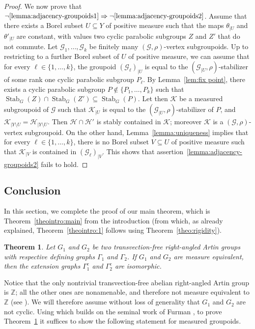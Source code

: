 \documentclass[11pt]{article}
\numberwithin{equation}{section}
\let\mathcal\mathscr
\theoremstyle{plain}
\newtheorem{theo}{Theorem}[section]
\theoremstyle{definition}
\newcommand{\calg}{\mathcal{G}}
\newcommand{\calh}{\mathcal{H}}
\newcommand{\calk}{\mathcal{K}}
\newcommand{\Stab}{\operatorname{Stab}}
\begin{document}
\begin{proof}
We now prove that $\neg \eqref{lemma:adjacency-groupoids1}\Rightarrow \neg \eqref{lemma:adjacency-groupoids2}$. Assume that there exists a Borel subset $U\subseteq Y$ of positive measure such that the maps $\theta_{|U}$ and $\theta'_{|U}$ are constant, with values two cyclic parabolic subgroups $Z$ and $Z'$ that do not commute. Let $\calg_1,\dots,\calg_k$ be finitely many $(\calg,\rho)$-vertex subgroupoids. Up to restricting to a further Borel subset of $U$ of positive measure, we can assume that for every $\ell\in\{1,\dots,k\}$, the groupoid $(\calg_\ell)_{|U}$ is equal to the $(\calg_{|U},\rho)$-stabilizer of some rank one cyclic parabolic subgroup $P_\ell$. By Lemma~\ref{lem:fix point}, there exists a cyclic parabolic subgroup $P\notin\{P_1,\dots,P_k\}$ such that $\Stab_G(Z)\cap\Stab_G(Z')\subseteq\Stab_G(P)$. Let then $\calk$ be a measured subgroupoid of $\calg$ such that $\calk_{|U}$ is equal to the $(\calg_{|U},\rho)$-stabilizer of $P$, and $\calk_{|Y\setminus U}=\calh_{|Y\setminus U}$. Then $\calh\cap\calh'$ is stably contained in $\calk$; moreover $\calk$ is a $(\calg,\rho)$-vertex subgroupoid. On the other hand, Lemma~\ref{lemma:uniqueness} implies that for every $\ell\in\{1,\dots,k\}$, there is no Borel subset $V\subseteq U$ of positive measure such that $\calk_{|V}$ is contained in $(\calg_\ell)_{|V}$. This shows that assertion~\eqref{lemma:adjacency-groupoids2} fails to hold.
\end{proof}

\subsection{Conclusion}

In this section, we complete the proof of our main theorem, which is Theorem~\ref{theointro:main} from the introduction (from which, as already explained, Theorem~\ref{theointro:1} follows using Theorem~\ref{theo:rigidity}).

\begin{theo}\label{theo:main}
Let $G_1$ and $G_2$ be two transvection-free right-angled Artin groups with respective defining graphs $\Gamma_1$ and $\Gamma_2$. If $G_1$ and $G_2$ are measure equivalent, then the extension graphs $\Gamma_1^e$ and $\Gamma_2^e$ are isomorphic.
\end{theo}

Notice that the only nontrivial transvection-free abelian right-angled Artin group is $\mathbb{Z}$; all the other ones are nonamenable, and therefore not measure equivalent to $\mathbb{Z}$ (see \cite[Cor.\,3.2]{Fur-survey}). We will therefore assume without loss of generality that $G_1$ and $G_2$ are not cyclic. Using \cite[Prop.\,5.11]{HH} which builds on the seminal work of Furman \cite{Fur2}, to prove Theorem~\ref{theo:main} it suffices to show the following statement for measured groupoids.
\end{document}
